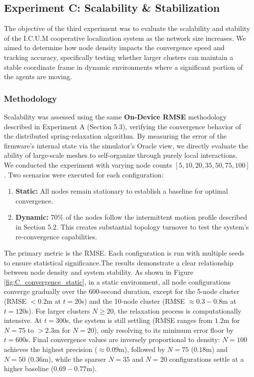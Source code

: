 \subsection{Experiment C: Scalability \& Stabilization}
\label{sec:exp_c}
\noindent The objective of the third experiment was to evaluate the scalability and stability of the I.C.U.M cooperative localization system as the network size increases. We aimed to determine how node density impacts the convergence speed and tracking accuracy, specifically testing whether larger clusters can maintain a stable coordinate frame in dynamic environments where a significant portion of the agents are moving.

\subsubsection{Methodology}
\noindent Scalability was assessed using the same \textbf{On-Device RMSE} methodology described in Experiment A (Section 5.3), verifying the convergence behavior of the distributed spring-relaxation algorithm. By measuring the error of the firmware's internal state via the simulator's Oracle view, we directly evaluate the ability of large-scale meshes to self-organize through purely local interactions.\\

\noindent We conducted the experiment with varying node counts $[5, 10, 20, 35, 50, 75, 100]$. Two scenarios were executed for each configuration:
\begin{enumerate}
    \item \textbf{Static:} All nodes remain stationary to establish a baseline for optimal convergence.
    \item \textbf{Dynamic:} 70\% of the nodes follow the intermittent motion profile described in Section 5.2. This creates substantial topology turnover to test the system's re-convergence capabilities.
\end{enumerate}
The primary metric is the RMSE. Each configuration is run with multiple seeds to ensure statistical significance.The results demonstrate a clear relationship between node density and system stability. As shown in Figure \ref{fig:C_convergence_static}, in a static environment, all node configurations converge gradually over the 600-second duration, except for the 5-node cluster (RMSE $< 0.2$m at $t=20$s) and the 10-node cluster (RMSE $\approx 0.3-0.8$m at $t=120$s). For larger clusters $N \ge 20$, the relaxation process is computationally intensive. At $t=300$s, the system is still settling (RMSE ranges from $1.2$m for $N=75$ to $>2.3$m for $N=20$), only resolving to its minimum error floor by $t=600$s. Final convergence values are inversely proportional to density: $N=100$ achieves the highest precision ($\approx 0.09$m), followed by $N=75$ ($0.18$m) and $N=50$ ($0.36$m), while the sparser $N=35$ and $N=20$ configurations settle at a higher baseline ($0.69-0.77$m). 

